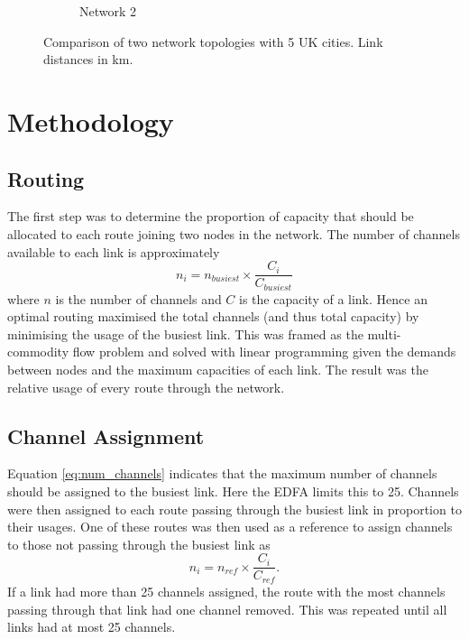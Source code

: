 \documentclass[12pt,a4paper]{article}
\begin{document}
\begin{figure}[H]
\begin{subfigure}[b]{0.45\textwidth}
\caption{Network 2}
\end{subfigure}
\caption{Comparison of two network topologies with 5 UK cities. Link distances in km.}
\label{fig:networks}
\end{figure}

\section{Methodology}
\subsection{Routing}
The first step was to determine the proportion of capacity that should be allocated to each route joining two nodes in the network. The number of channels available to each link is approximately 
\begin{equation}
n_i = n_{busiest} \times \frac{C_i}{C_{busiest}}
\label{eq:num_channels}
\end{equation}
where \(n\) is the number of channels and \(C\) is the capacity of a link. Hence an optimal routing maximised the total channels (and thus total capacity) by minimising the usage of the busiest link. This was framed as the multi-commodity flow problem and solved with linear programming given the demands between nodes and the maximum capacities of each link. The result was the relative usage of every route through the network.
\subsection{Channel Assignment}
Equation \ref{eq:num_channels} indicates that the maximum number of channels should be assigned to the busiest link. Here the EDFA limits this to 25. Channels were then assigned to each route passing through the busiest link in proportion to their usages. One of these routes was then used as a reference to assign channels to those not passing through the busiest link as
\begin{equation}
    n_i = n_{ref} \times \frac{C_i}{C_{ref}}.
\end{equation}
If a link had more than 25 channels assigned, the route with the most channels passing through that link had one channel removed. This was repeated until all links had at most 25 channels.
\end{document}
